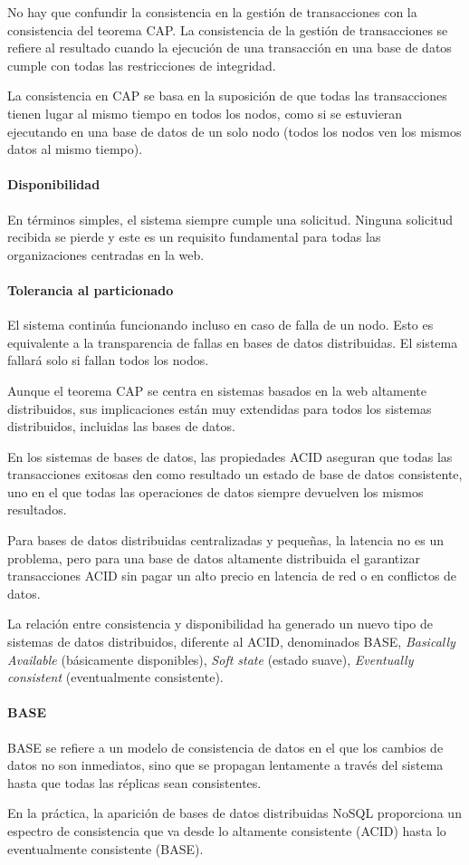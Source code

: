 No hay que confundir la consistencia en la gestión de transacciones con la consistencia del teorema CAP. La consistencia de la gestión de transacciones se refiere al resultado cuando la ejecución de una transacción en una base de datos cumple con todas las restricciones de integridad.


La consistencia en CAP se basa en la suposición de que todas las transacciones tienen lugar al mismo tiempo en todos los nodos, como si se estuvieran ejecutando en una base de datos de un solo nodo (todos los nodos ven los mismos datos al mismo tiempo).

\paragraph*{Disponibilidad}
En términos simples, el sistema siempre cumple una solicitud. Ninguna solicitud recibida se pierde y este es un requisito fundamental para todas las organizaciones centradas en la web.

\paragraph*{Tolerancia al particionado}
El sistema continúa funcionando incluso en caso de falla de un nodo. Esto es equivalente a la transparencia de fallas en bases de datos distribuidas. El sistema fallará solo si fallan todos los nodos.

Aunque el teorema CAP se centra en sistemas basados ​​en la web altamente distribuidos, sus implicaciones están muy extendidas para todos los sistemas distribuidos, incluidas las bases de datos.


En los sistemas de bases de datos, las propiedades ACID aseguran que todas las transacciones exitosas den como resultado un estado de base de datos consistente, uno en el que todas las operaciones de datos siempre devuelven los mismos resultados. 


Para bases de datos distribuidas centralizadas y pequeñas, la latencia no es un problema, pero para una base de datos altamente distribuida el garantizar transacciones ACID sin pagar un alto precio en latencia de red o en conflictos de datos.


La relación entre consistencia y disponibilidad ha generado un nuevo tipo de sistemas de datos distribuidos, diferente al ACID, denominados BASE, \textit{Basically Available} (básicamente disponibles), \textit{Soft state} (estado suave), \textit{Eventually consistent} (eventualmente consistente).

\paragraph*{BASE}

BASE se refiere a un modelo de consistencia de datos en el que los cambios de datos no son inmediatos, sino que se propagan lentamente a través del sistema hasta que todas las réplicas sean consistentes. 


En la práctica, la aparición de bases de datos distribuidas NoSQL proporciona un espectro de consistencia que va desde lo altamente consistente (ACID) hasta lo eventualmente consistente (BASE).

